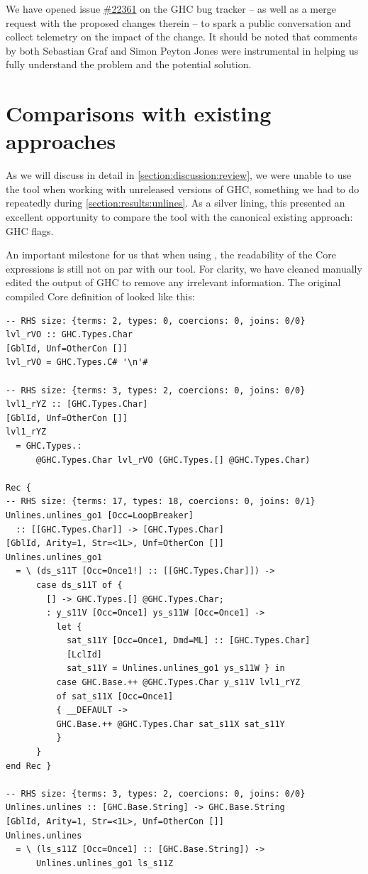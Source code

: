 We have opened issue \href{https://gitlab.haskell.org/ghc/ghc/-/issues/22361}{\#22361} on the GHC bug tracker -- 
as well as a merge request with the proposed changes therein -- to spark a public conversation and collect telemetry on the impact of the change.
It should be noted that comments by both Sebastian Graf and Simon Peyton Jones were instrumental in helping us fully understand the problem and
the potential solution.

\section{Comparisons with existing approaches}

As we will discuss in detail in \cref{section:discussion:review}, we were unable to use the tool when working with unreleased
versions of GHC, something we had to do repeatedly during \cref{section:results:unlines}. As a silver lining, this presented
an excellent opportunity to compare the tool with the canonical existing approach: GHC flags.

An important milestone for us that when using , the readability of the Core expressions is still not on par
with our tool. For clarity, we have cleaned manually edited the output of GHC to remove any irrelevant information. The original 
compiled Core definition of  looked like this:

\begin{listing}[H]
\begin{verbatim}
-- RHS size: {terms: 2, types: 0, coercions: 0, joins: 0/0}
lvl_rVO :: GHC.Types.Char
[GblId, Unf=OtherCon []]
lvl_rVO = GHC.Types.C# '\n'#

-- RHS size: {terms: 3, types: 2, coercions: 0, joins: 0/0}
lvl1_rYZ :: [GHC.Types.Char]
[GblId, Unf=OtherCon []]
lvl1_rYZ
  = GHC.Types.:
      @GHC.Types.Char lvl_rVO (GHC.Types.[] @GHC.Types.Char)

Rec {
-- RHS size: {terms: 17, types: 18, coercions: 0, joins: 0/1}
Unlines.unlines_go1 [Occ=LoopBreaker]
  :: [[GHC.Types.Char]] -> [GHC.Types.Char]
[GblId, Arity=1, Str=<1L>, Unf=OtherCon []]
Unlines.unlines_go1
  = \ (ds_s11T [Occ=Once1!] :: [[GHC.Types.Char]]) ->
      case ds_s11T of {
        [] -> GHC.Types.[] @GHC.Types.Char;
        : y_s11V [Occ=Once1] ys_s11W [Occ=Once1] ->
          let {
            sat_s11Y [Occ=Once1, Dmd=ML] :: [GHC.Types.Char]
            [LclId]
            sat_s11Y = Unlines.unlines_go1 ys_s11W } in
          case GHC.Base.++ @GHC.Types.Char y_s11V lvl1_rYZ
          of sat_s11X [Occ=Once1]
          { __DEFAULT ->
          GHC.Base.++ @GHC.Types.Char sat_s11X sat_s11Y
          }
      }
end Rec }

-- RHS size: {terms: 3, types: 2, coercions: 0, joins: 0/0}
Unlines.unlines :: [GHC.Base.String] -> GHC.Base.String
[GblId, Arity=1, Str=<1L>, Unf=OtherCon []]
Unlines.unlines
  = \ (ls_s11Z [Occ=Once1] :: [GHC.Base.String]) ->
      Unlines.unlines_go1 ls_s11Z
\end{verbatim}
\end{listing}

